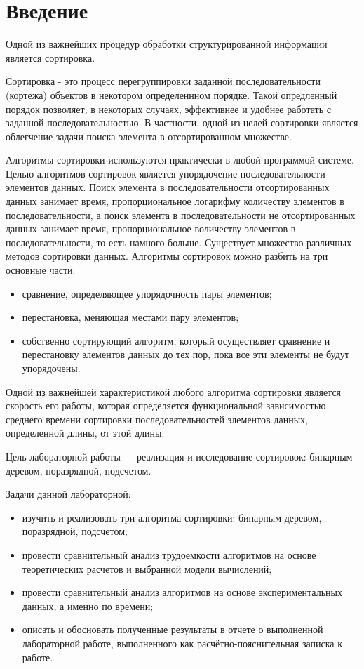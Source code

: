 \chapter*{Введение}



Одной из важнейших процедур обработки структурированной информации является сортировка.

Сортировка - это процесс перегруппировки заданной последовательности (кортежа) объектов в некотором определеннном порядке. Такой опредленный порядок позволяет, в некоторых случаях, эффективнее и удобнее работать с заданной последовательностью. В частности, одной из целей сортировки является облегчение задачи поиска элемента в отсортированном множестве. 

Алгоритмы сортировки используются практически в любой программой системе. Целью алгоритмов сортировок является упорядочение последовательности элементов данных. Поиск элемента в последовательности отсортированных данных занимает время, пропорциональное логарифму количеству элементов в последовательности, а поиск элемента в последовательности не отсортированных данных занимает время, пропорциональное воличеству элементов в последовательности, то есть намного больше. Существует множество различных методов сортировки данных. Алгоритмы сортировок можно разбить на три основные части:

\begin{itemize}
	\item сравнение, определяющее упорядочность пары элементов;
	\item перестановка, меняющая местами пару элементов;
	\item собственно сортирующий алгоритм, который осуществляет сравнение
	и перестановку элементов данных до тех пор, пока все эти элементы
	не будут упорядочены.
\end{itemize}

Одной из важнейшей характеристикой любого алгоритма сортировки является скорость его работы, которая определяется функциональной зависимостью среднего времени сортировки последовательностей элементов данных, определенной длины, от этой длины.


Цель лабораторной работы --- реализация и исследование сортировок: бинарным деревом, поразрядной, подсчетом.

\newpage

Задачи данной лабораторной:

\begin{itemize}
	\item изучить и реализовать три алгоритма сортировки: бинарным деревом, поразрядной, подсчетом;
	\item провести сравнительный анализ трудоемкости алгоритмов на основе теоретических расчетов и выбранной модели вычислений;
	\item провести сравнительный анализ алгоритмов на основе экспериментальных данных, а именно по времени;
	\item описать и обосновать полученные результаты в отчете о выполненной лабораторной работе, выполненного как расчётно-пояснительная записка к работе.
\end{itemize}